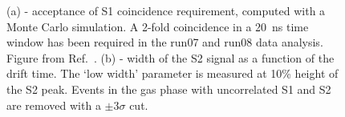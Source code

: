 \begin{figure}[!h]
\centering
{}
\caption[Acceptance of S1 coincidence requirement, and the S2 signal width]{(a) - acceptance of S1 coincidence requirement, computed with a Monte Carlo simulation. A 2-fold coincidence in a 20~ns time window has been required in the run07 and run08 data analysis. Figure from Ref.~\cite{Guillaume}. (b) - width of the S2 signal as a function of the drift time. The `low width' parameter is measured at 10\% height of the S2 peak. Events in the gas phase with uncorrelated S1 and S2 are removed with a $\pm$3$\sigma$ cut.}
\label{figCutCoincidence}
\end{figure}


